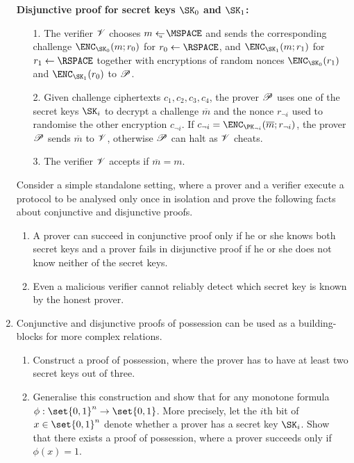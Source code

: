 \documentclass{article}
\begin{document}
\begin{enumerate}
  \textbf{Disjunctive proof for secret keys $\SK_0$ and $\SK_1$:}
  \begin{enumerate}
  \item[1.] The verifier $\mathscr{V}$ chooses $m\getsu\MSPACE$ and
    sends the corresponding challenge $\ENC_{\SK_0}(m;r_0)$ for
    $r_0\gets\RSPACE$, and $\ENC_{\SK_1}(m;r_1)$ for $r_1\gets\RSPACE$
    together with encryptions of random nonces $\ENC_{\SK_0}(r_1)$ and
    $\ENC_{\SK_1}(r_0)$ to $\mathscr{P}$.
  \item[2.]  Given challenge ciphertexts $c_1,c_2,c_3,c_4$, the prover
    $\mathscr{P}$ uses one of the secret keys $\SK_i$ to decrypt a
    challenge $\overline{m}$ and the nonce $r_{\neg i}$ used to
    randomise the other encryption $c_{\neg i}$. If $c_{\neg i}=
    \ENC_{\PK_{\neg i}}(\overline{m};r_{\neg i})$, the prover
    $\mathscr{P}$ sends $\overline{m}$ to $\mathscr{V}$, otherwise $\mathscr{P}$
    can halt as $\mathscr{V}$ cheats.
  \item[3.] The verifier $\mathscr{V}$ accepts if $\overline{m}=m$.
  \end{enumerate}
  Consider a simple standalone setting, where a prover and a verifier
  execute a protocol to be analysed only once in isolation and prove
  the following facts about conjunctive and disjunctive proofs.
  \begin{enumerate}
  \item A prover can succeed in conjunctive proof only if he or she
    knows both secret keys and a prover fails in disjunctive proof if
    he or she does not know neither of the secret keys.
  \item Even a malicious verifier cannot reliably detect which secret
    key is known by the honest prover.
  \end{enumerate}
\item Conjunctive and disjunctive proofs of possession can be used as
  a building-blocks for more complex relations. 
  \begin{enumerate}
  \item Construct a proof of possession, where the prover has to have
    at least two secret keys out of three.
  \item Generalise this construction and show that for any monotone
    formula $\phi:\set{0,1}^n\to\set{0,1}$. More precisely, let the
    $i$th bit of $x\in\set{0,1}^n$ denote whether a prover has a
    secret key $\SK_i$. Show that there exists a proof of possession,
    where a prover succeeds only if $\phi(x)=1$.
  \end{enumerate}
\end{enumerate}
\end{document}
